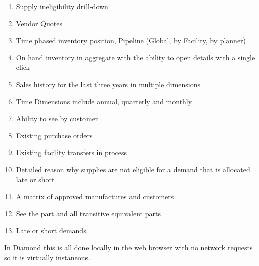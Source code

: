 \documentclass[letterpaper,10pt,english]{sphinxmanual}
\begin{document}
\begin{enumerate}
\item {} 
Supply ineligibility drill-down

\item {} 
Vendor Quotes

\item {} 
Time phased inventory position, Pipeline (Global, by Facility, by
planner)

\item {} 
On hand inventory in aggregate with the ability to open details with
a single click

\item {} 
Sales history for the last three years in multiple dimensions

\item {} 
Time Dimensions include annual, quarterly and monthly

\item {} 
Ability to see by customer

\item {} 
Existing purchase orders

\item {} 
Existing facility transfers in process

\item {} 
Detailed reason why supplies are not eligible for a demand that is
allocated late or short

\item {} 
A matrix of approved manufactures and customers

\item {} 
See the part and all transitive equivalent parts

\item {} 
Late or short demands

\end{enumerate}

In Diamond this is all done locally in the web browser with no network
requests so it is virtually instaneous.
\end{document}
